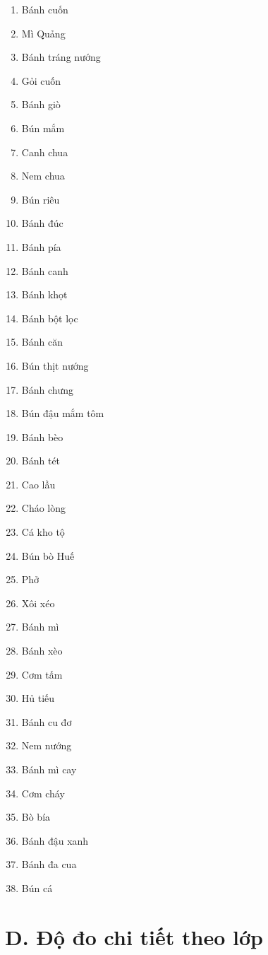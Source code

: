 \begin{enumerate}
\item Bánh cuốn \item Mì Quảng \item Bánh tráng nướng \item Gỏi cuốn
\item Bánh giò \item Bún mắm \item Canh chua \item Nem chua
\item Bún riêu \item Bánh đúc \item Bánh pía \item Bánh canh
\item Bánh khọt \item Bánh bột lọc \item Bánh căn \item Bún thịt nướng
\item Bánh chưng \item Bún đậu mắm tôm \item Bánh bèo \item Bánh tét
\item Cao lầu \item Cháo lòng \item Cá kho tộ \item Bún bò Huế
\item Phở \item Xôi xéo \item Bánh mì \item Bánh xèo
\item Cơm tấm \item Hủ tiếu \item Bánh cu đơ \item Nem nướng
\item Bánh mì cay \item Cơm cháy \item Bò bía \item Bánh đậu xanh
\item Bánh đa cua \item Bún cá
\end{enumerate}

\section*{D. Độ đo chi tiết theo lớp}
{}


